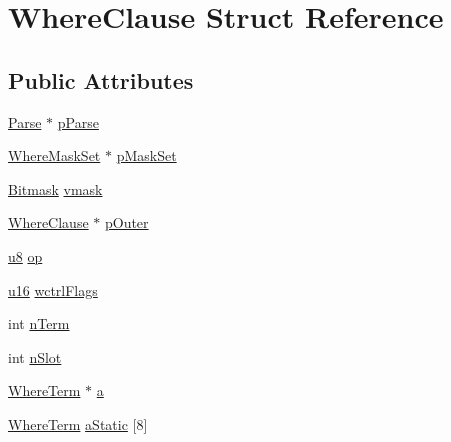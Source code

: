 \hypertarget{struct_where_clause}{\section{Where\-Clause Struct Reference}
\label{struct_where_clause}
}
\subsection*{Public Attributes}
\begin{DoxyCompactItemize}
\item 
\hyperlink{struct_parse}{Parse} $\ast$ \hyperlink{struct_where_clause_a3ff6dfc93e7b9b97a9bf9a0618a1d542}{p\-Parse}
\item 
\hyperlink{struct_where_mask_set}{Where\-Mask\-Set} $\ast$ \hyperlink{struct_where_clause_ae308a1600721b7dfa0855136926a5554}{p\-Mask\-Set}
\item 
\hyperlink{sqlite3_8c_afa77b629897c4457bfdc47d364ba5c3f}{Bitmask} \hyperlink{struct_where_clause_aaef3dd42bb6c23890d8ad8824e2a00ee}{vmask}
\item 
\hyperlink{struct_where_clause}{Where\-Clause} $\ast$ \hyperlink{struct_where_clause_a6f72d61f416a323f39a8d3e2be62f607}{p\-Outer}
\item 
\hyperlink{sqlite3_8c_a74a0f6424ae628af25f23f0a35f6ead3}{u8} \hyperlink{struct_where_clause_a7a56a5fe1ab6603e930f3b5372ff2f71}{op}
\item 
\hyperlink{sqlite3_8c_a20f2299e322dcbde37cb07b16910b843}{u16} \hyperlink{struct_where_clause_a65f8d6f982be80ca3336483ddb8a2f3e}{wctrl\-Flags}
\item 
int \hyperlink{struct_where_clause_ab84924c3c78af1ab387ab3919c5031c4}{n\-Term}
\item 
int \hyperlink{struct_where_clause_ac92b93d65d4c3d9216707a049a4edb1c}{n\-Slot}
\item 
\hyperlink{struct_where_term}{Where\-Term} $\ast$ \hyperlink{struct_where_clause_a140d726a3e20ac7b6853d539c59add72}{a}
\item 
\hyperlink{struct_where_term}{Where\-Term} \hyperlink{struct_where_clause_a4acb8640bc9f42752900de5735bcd8e0}{a\-Static} \mbox{[}8\mbox{]}
\end{DoxyCompactItemize}


